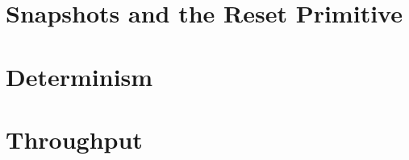 \section{Snapshots and the Reset Primitive}\label{sec:platform-snapshots}


\section{Determinism}\label{sec:platform-determinism}


\section{Throughput}\label{sec:platform-throughput}

